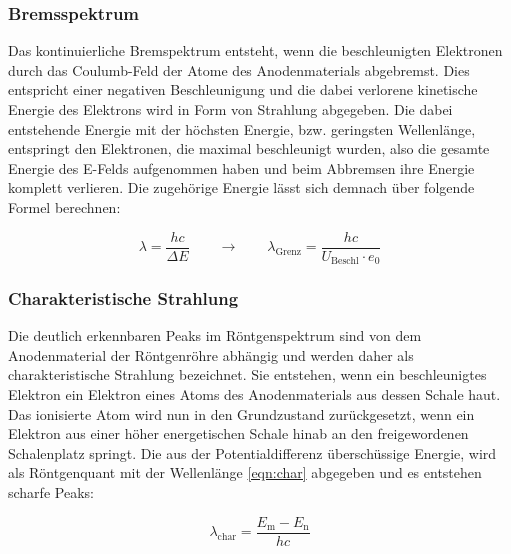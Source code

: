 \documentclass[titlepage = firstcover]{scrartcl}
\begin{document}
            \FloatBarrier

            \subsubsection{Bremsspektrum}
                Das kontinuierliche Bremspektrum entsteht, wenn die beschleunigten Elektronen durch das Coulumb-Feld der Atome des Anodenmaterials abgebremst. Dies entspricht einer negativen 
                Beschleunigung und die dabei verlorene kinetische Energie des Elektrons wird in Form von Strahlung abgegeben. Die dabei entstehende Energie mit der höchsten Energie, bzw. geringsten 
                Wellenlänge, entspringt den Elektronen, die maximal beschleunigt wurden, also die gesamte Energie des E-Felds aufgenommen haben und beim Abbremsen ihre Energie komplett verlieren. 
                Die zugehörige Energie lässt sich demnach über folgende Formel berechnen:

                \begin{equation*}
                    \lambda = \frac{hc}{\Delta E} \qquad \longrightarrow \qquad \lambda_{\text{Grenz}} = \frac{hc}{U_{\text{Beschl}}\cdot e_0}
                \end{equation*}
                \noindent
            
            \subsubsection{Charakteristische Strahlung}
                Die deutlich erkennbaren Peaks im Röntgenspektrum sind von dem Anodenmaterial der Röntgenröhre abhängig und werden daher als charakteristische Strahlung bezeichnet. Sie entstehen, wenn
                ein beschleunigtes Elektron ein Elektron eines Atoms des Anodenmaterials aus dessen Schale haut. Das ionisierte Atom wird nun in den Grundzustand zurückgesetzt, wenn ein Elektron 
                aus einer höher energetischen Schale hinab an den freigewordenen Schalenplatz springt. Die aus der Potentialdifferenz überschüssige Energie, wird als Röntgenquant mit der
                Wellenlänge \ref{eqn:char} abgegeben und es entstehen scharfe Peaks:
                
                \begin{equation}
                    \lambda_{\text{char}} = \frac{E_{\text{m}}-E_{\text{n}}}{hc}
                    \label{eqn:char}
                \end{equation}
                
\end{document}
